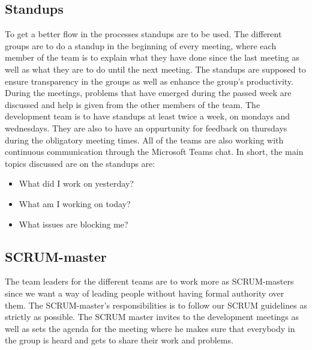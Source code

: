 \subsection{Standups}
To get a better flow in the processes standups are to be used. The different groups are to do a standup in the beginning of every meeting, where each member of the team is to explain what they have done since the last meeting as well as what they are to do until the next meeting. The standups are supposed to ensure transparency in the groups as well as enhance the group's productivity. During the meetings, problems that have emerged during the passed week are discussed and help is given from the other members of the team. The development team is to have standups at least twice a week, on mondays and wednesdays. They are also to have an oppurtunity for feedback on thursdays during the obligatory meeting times. All of the teams are also working with continuous communication through the Microsoft Teams chat. In short, the main topics discussed are on the standups are: 
\begin{itemize}
    \item What did I work on yesterday?
    \item What am I working on today?
    \item What issues are blocking me?
\end{itemize}



\subsection{SCRUM-master}
The team leaders for the different teams are to work more as SCRUM-masters since we want a way of leading people without having formal authority over them. The SCRUM-master's responsibilities is to follow our SCRUM guidelines as strictly as possible. The SCRUM master invites to the development meetings as well as sets the agenda for the meeting where he makes sure that everybody in the group is heard and gets to share their work and problems. 


